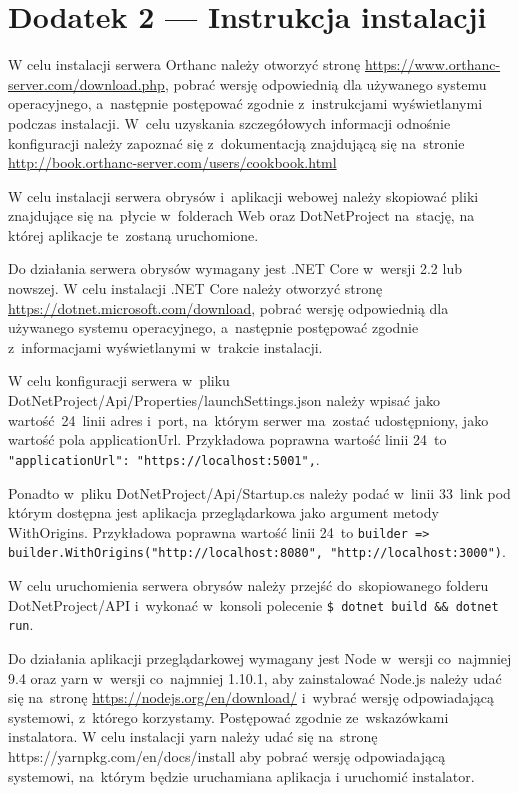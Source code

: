\documentclass[a4paper,11pt,twoside,openright]{report}
\theoremstyle{definition}
\begin{document}
\chapter*{Dodatek 2 --- Instrukcja instalacji}

W celu instalacji serwera Orthanc należy otworzyć stronę
\url{https://www.orthanc-server.com/download.php}, pobrać wersję odpowiednią dla
używanego systemu operacyjnego, a~następnie postępować zgodnie z~instrukcjami
wyświetlanymi podczas instalacji. W~celu uzyskania szczegółowych informacji
odnośnie konfiguracji należy zapoznać się z~dokumentacją znajdującą się na~stronie
\url{http://book.orthanc-server.com/users/cookbook.html}

W celu instalacji serwera obrysów i~aplikacji webowej należy skopiować pliki
znajdujące się na~płycie w~folderach Web oraz DotNetProject na~stację,
na której aplikacje te~zostaną uruchomione.

Do działania serwera obrysów wymagany jest .NET Core w~wersji 2.2 lub nowszej.
W celu instalacji .NET Core należy otworzyć stronę \url{https://dotnet.microsoft.com/download},
pobrać wersję odpowiednią dla używanego systemu operacyjnego, a~następnie
postępować zgodnie z~informacjami wyświetlanymi w~trakcie instalacji.

W celu konfiguracji serwera w~pliku DotNetProject/Api/Properties/launchSettings.json
należy wpisać jako wartość~24~linii adres i~port, na~którym serwer ma~zostać
udostępniony, jako wartość pola applicationUrl. Przykładowa poprawna wartość
linii 24~to\texttt{ "applicationUrl": "https://localhost:5001",}.

Ponadto w~pliku DotNetProject/Api/Startup.cs należy podać w~linii 33~link pod
którym dostępna jest aplikacja przeglądarkowa jako argument metody WithOrigins.
Przykładowa poprawna wartość linii 24~to
\texttt{builder => builder.WithOrigins("http://localhost:8080", "http://localhost:3000")}.

W celu uruchomienia serwera obrysów należy przejść do~skopiowanego folderu
DotNetProject/API i~wykonać w~konsoli polecenie \texttt{\$ dotnet build \&\& dotnet run}.

Do działania aplikacji przeglądarkowej wymagany jest Node w~wersji co~najmniej
9.4 oraz yarn w~wersji co~najmniej 1.10.1, aby zainstalować Node.js należy udać
się na~stronę \url{https://nodejs.org/en/download/} i~wybrać wersję odpowiadającą
systemowi, z~którego korzystamy. Postępować zgodnie ze~wskazówkami instalatora.
W celu instalacji yarn należy udać się na~stronę https://yarnpkg.com/en/docs/install
aby pobrać wersję odpowiadającą systemowi, na~którym będzie uruchamiana aplikacja
i uruchomić instalator.
\end{document}

